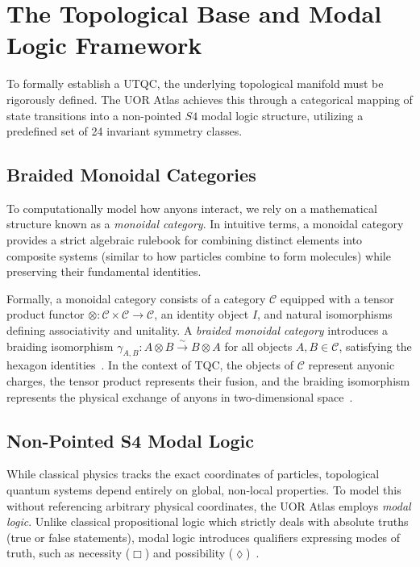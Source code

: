 \section{The Topological Base and Modal Logic Framework}

To formally establish a UTQC, the underlying topological manifold must be rigorously defined. The UOR Atlas achieves this through a categorical mapping of state transitions into a non-pointed $S4$ modal logic structure, utilizing a predefined set of 24 invariant symmetry classes.

\subsection{Braided Monoidal Categories}
To computationally model how anyons interact, we rely on a mathematical structure known as a \textit{monoidal category}. In intuitive terms, a monoidal category provides a strict algebraic rulebook for combining distinct elements into composite systems (similar to how particles combine to form molecules) while preserving their fundamental identities.

Formally, a monoidal category consists of a category $\mathcal{C}$ equipped with a tensor product functor $\otimes: \mathcal{C} \times \mathcal{C} \rightarrow \mathcal{C}$, an identity object $I$, and natural isomorphisms defining associativity and unitality. A \textit{braided monoidal category} introduces a braiding isomorphism $\gamma_{A,B}: A \otimes B \xrightarrow{\sim} B \otimes A$ for all objects $A, B \in \mathcal{C}$, satisfying the hexagon identities~\cite{joyal1993}. In the context of TQC, the objects of $\mathcal{C}$ represent anyonic charges, the tensor product represents their fusion, and the braiding isomorphism represents the physical exchange of anyons in two-dimensional space~\cite{wang2010}.

\subsection{Non-Pointed S4 Modal Logic}
While classical physics tracks the exact coordinates of particles, topological quantum systems depend entirely on global, non-local properties. To model this without referencing arbitrary physical coordinates, the UOR Atlas employs \textit{modal logic}. Unlike classical propositional logic which strictly deals with absolute truths (true or false statements), modal logic introduces qualifiers expressing modes of truth, such as necessity ($\Box$) and possibility ($\lozenge$)~\cite{blackburn2001}.


